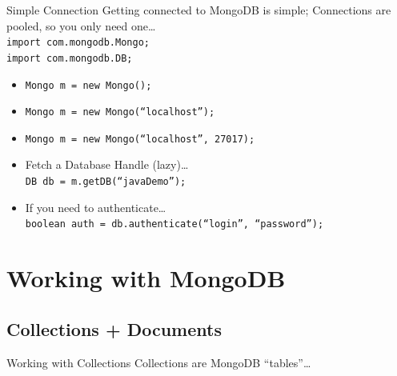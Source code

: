 \documentclass{beamer}
\begin{document}
\begin{frame}{Simple Connection}
    Getting connected to MongoDB is simple; 
    Connections are pooled, so you only need one\dots\\
    \texttt{\scriptsize import com.mongodb.Mongo;\\ import com.mongodb.DB; }
    \pause
    \begin{itemize}
        \item{\texttt{\scriptsize Mongo m = new Mongo();}}
        \item{\texttt{\scriptsize Mongo m = new Mongo(``localhost'');}}
        \item{\texttt{\scriptsize Mongo m = new Mongo(``localhost'', 27017);}}
        \item<3->{Fetch a Database Handle (lazy)\dots\\
            \texttt{\scriptsize DB db = m.getDB(``javaDemo'');}} 
        \item<4->{If you need to authenticate\dots\\
        \texttt{\scriptsize boolean auth = db.authenticate(``login'', ``password'');}
        }
    \end{itemize}

\end{frame}

\section{Working with MongoDB}

\subsection[Collections + Documents]{Collections + Documents}

\begin{frame}{Working with Collections}
    Collections are MongoDB ``tables''\dots
    \pause
\end{frame}
\end{document}
